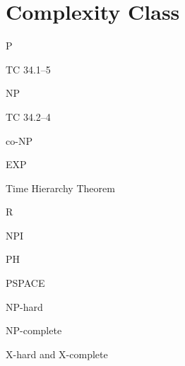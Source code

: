 \section{Complexity Class}

\begin{frame}{P}
  \begin{exampleblock}{TC 34.1--5}
  \end{exampleblock}
\end{frame}
\begin{frame}{NP}
  \begin{exampleblock}{TC 34.2--4}
  \end{exampleblock}
\end{frame}
\begin{frame}{co-NP}
\end{frame}
\begin{frame}{EXP}
\end{frame}
\begin{frame}{Time Hierarchy Theorem}
\end{frame}
\begin{frame}{R}
\end{frame}
\begin{frame}{NPI}
\end{frame}
\begin{frame}{PH}
\end{frame}
\begin{frame}{PSPACE}
\end{frame}
\begin{frame}{NP-hard}
\end{frame}
\begin{frame}{NP-complete}
\end{frame}
\begin{frame}{X-hard and X-complete}
\end{frame}
